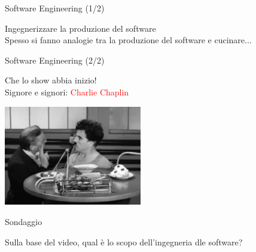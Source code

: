\documentclass{beamer}
\begin{document}
\begin{frame}{\centerline{Software Engineering (1/2)}}
\begin{center}
{\Large
Ingegnerizzare la produzione del software\\
}
\vspace{2cm}
Spesso si fanno analogie tra la produzione del software e cucinare...
\end{center}
\end{frame}

\begin{frame}{\centerline{Software Engineering (2/2)}}
\begin{center}
\Large
Che lo show abbia inizio!\\
\vspace*{0.5cm}
Signore e signori: \textcolor{red}{Charlie Chaplin}
\end{center}
\begin{center}
\includegraphics[width=60mm]{A2022.IDSEPC.ProcessoDiProduzione/Chaplin_ModernTimes.png}
\end{center}

\end{frame}



\begin{frame}{\centerline{Sondaggio}}
\begin{center}
Sulla base del video, qual \`{e} lo scopo dell'ingegneria dle software?
\end{center}
\end{frame}
\end{document}
